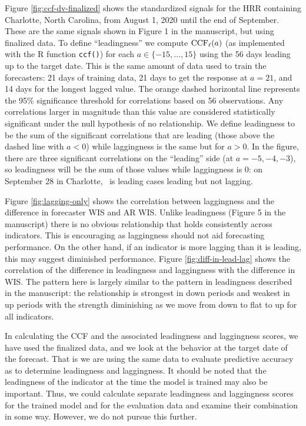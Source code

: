 Figure \ref{fig:ccf-dv-finalized} shows the standardized signals for the HRR
containing Charlotte, North Carolina, from August 1, 2020 until the end of
September. These are the same signals shown in Figure 1 in the manuscript, but 
using finalized data. To define ``leadingness'' we compute $\mathrm{CCF}_{\ell}(a)$ (as
implemented with the R function {\tt ccf()}) for each $a\in \{-15,\ldots,15\}$
using the 56 days leading up to the target date. This is the same amount of data
used to train the forecasters: 21 days of training data, 21 days to get the
response at $a=21$, and 14 days for the longest lagged value. The orange dashed
horizontal line represents the 95\% significance threshold for correlations
based on 56 observations. Any correlations larger in magnitude than this value
are considered statistically significant under the null hypothesis of no
relationship. We define leadingness to be the sum of the significant
correlations that are leading (those above the dashed line with $a<0$) while
laggingness is the same but for $a>0$. In the figure, there are three
significant correlations on the ``leading'' side (at $a = -5, -4, -3$), so
leadingness will be the sum of those values while laggingness is 0: on September
28 in Charlotte, \dv~is leading cases leading but not lagging.

Figure \ref{fig:lagging-only} shows the correlation between laggingness and the
difference in forecaster WIS and AR WIS. Unlike leadingness (Figure 5 in the
manuscript) there is no obvious relationship that holds consistently across
indicators. This is encouraging as laggingness should not aid forecasting 
performance. On the other hand, if an indicator is more lagging than it is
leading, this may suggest diminished performance.
Figure \ref{fig:diff-in-lead-lag} shows the correlation of the difference in
leadingness and laggingness with the difference in WIS. The pattern here is
largely similar to the pattern in leadingness described in the manuscript: the
relationship is strongest in down periods and weakest in up periods with the
strength diminishing as we move from down to flat to up for all indicators.

In calculating the CCF and the associated leadingness and laggingness scores, we
have used the finalized data, and we look at the behavior at the target date of
the forecast. That is we are using the same data to evaluate predictive accuracy
as to determine leadingness and laggingness. It should be noted that the
leadingness of the indicator at the time the model is trained may also be
important.  Thus, we could calculate separate leadingness and laggingness scores
for the trained model and for the evaluation data and examine their combination
in some way.  However, we do not pursue this further.

